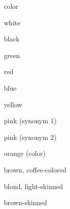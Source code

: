 

\begin{flashcard}{\LARGE color}
\LARGE {}
\end{flashcard}
\begin{flashcard}{\LARGE white}
\LARGE {}
\end{flashcard}
\begin{flashcard}{\LARGE black}
\LARGE {}
\end{flashcard}
\begin{flashcard}{\LARGE green}
\LARGE {}
\end{flashcard}
\begin{flashcard}{\LARGE red}
\LARGE {}
\end{flashcard}
\begin{flashcard}{\LARGE blue}
\LARGE {}
\end{flashcard}
\begin{flashcard}{\LARGE yellow}
\LARGE {}
\end{flashcard}
\begin{flashcard}{\LARGE pink (synonym 1)}
\LARGE {}
\end{flashcard}
\begin{flashcard}{\LARGE pink (synonym 2)}
\LARGE {}
\end{flashcard}
\begin{flashcard}{\LARGE orange (color)}
\LARGE {}
\end{flashcard}
\begin{flashcard}{\LARGE brown, coffee-colored}
\LARGE {}
\end{flashcard}
\begin{flashcard}{\LARGE blond, light-skinned}
\LARGE {}
\end{flashcard}
\begin{flashcard}{\LARGE brown-skinned}
\LARGE {}
\end{flashcard}

